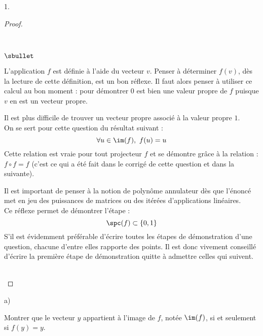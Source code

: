 \documentclass[11pt]{article}%
\begin{document}
\begin{noliste}{1.}
\begin{proof}
     \newpage


     \begin{remark}~
       \begin{noliste}{$\sbullet$}
       \item L'application $f$ est définie à l'aide du vecteur
         $v$. Penser à déterminer $f(v)$, dès la lecture de cette
         définition, est un bon réflexe. Il faut alors penser à
         utiliser ce calcul au bon moment : pour démontrer $0$ est
         bien une valeur propre de $f$ puisque $v$ en est un vecteur
         propre.
         
       \item Il est plus difficile de trouver un vecteur propre
         associé à la valeur propre $1$.\\
         On se sert pour cette question du résultat suivant :
         \[
         \forall u \in \im(f), \ f(u) = u
         \]
         Cette relation est vraie pour tout projecteur $f$ et se
         démontre grâce à la relation : $f \circ f=f$ (c'est ce qui a
         été fait dans le corrigé de cette question et dans la
         suivante).
         
       \item Il est important de penser à la notion de polynôme
         annulateur dès que l'énoncé met en jeu des puissances de
         matrices ou des itérées d'applications linéaires.\\
         Ce réflexe permet de démontrer l'étape :
         \[
         \spc(f) \subset \{0,1\}
         \]
         S'il est évidemment préférable d'écrire toutes les étapes de
         démonstration d'une question, chacune d'entre elles rapporte
         des points. Il est donc vivement conseillé d'écrire la
         première étape de démonstration quitte à admettre celles qui
         suivent.
       \end{noliste}
     \end{remark}~\\[-1.4cm]
   \end{proof}
   
 \item 
 \begin{noliste}{a)}
  \setlength{\itemsep}{1mm}
  \item Montrer que le vecteur $y$ appartient à l'image de $f$, 
  notée $\im(f)$, si et seulement si $f(y)=y$.
  

\end{noliste}
\end{noliste}
\end{document}
